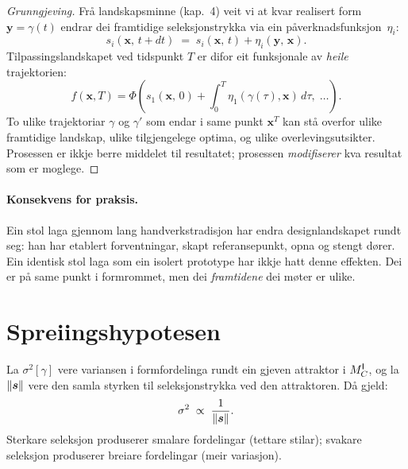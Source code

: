 \begin{proof}[Grunngjeving]
Frå landskapsminne (kap.~4) veit vi at kvar realisert form
$\bm{y} = \gamma(t)$ endrar dei framtidige seleksjonstrykka via
ein påverknadsfunksjon~$\eta_i$:
\[
  s_i(\bm{x},\, t + dt) \;=\;
  s_i(\bm{x},\, t) + \eta_i(\bm{y},\, \bm{x}).
\]
Tilpassingslandskapet ved tidspunkt $T$ er difor eit funksjonale
av \emph{heile} trajektorien:
\[
  f(\bm{x}, T) = \Phi\!\left(
    s_1\!\left(\bm{x},\, 0\right) +
    \int_0^T \!\eta_1(\gamma(\tau), \bm{x})\, d\tau,\;
    \ldots
  \right).
\]
To ulike trajektoriar $\gamma$ og $\gamma'$ som endar i same
punkt $\bm{x}^T$ kan stå overfor ulike framtidige landskap, ulike
tilgjengelege optima, og ulike overlevingsutsikter. Prosessen er
ikkje berre middelet til resultatet; prosessen \emph{modifiserer}
kva resultat som er moglege.
\end{proof}

\paragraph{Konsekvens for praksis.}
Ein stol laga gjennom lang handverkstradisjon har endra
designlandskapet rundt seg: han har etablert forventningar,
skapt referansepunkt, opna og stengt dører. Ein identisk stol
laga som ein isolert prototype har ikkje hatt denne effekten. Dei
er på same punkt i formrommet, men dei \emph{framtidene} dei møter
er ulike.


\section{Spreiingshypotesen}

\begin{satmark}[Spreiingsrelasjonen]\label{thm:L.8.4}
La $\sigma^2[\gamma]$ vere variansen i formfordelinga rundt ein
gjeven attraktor i $M^{\mathsf{I}}_C$, og la $\lVert \bm{s} \rVert$ vere den samla
styrken til seleksjonstrykka ved den attraktoren. Då gjeld:
\[
  \sigma^2 \;\propto\; \frac{1}{\lVert \bm{s} \rVert}.
\]
Sterkare seleksjon produserer smalare fordelingar (tettare
stilar); svakare seleksjon produserer breiare fordelingar (meir
variasjon).
\end{satmark}


